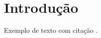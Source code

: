 \section{Introdução}
\label{sec:introducao}


Exemplo de texto com citação \cite{stallings2008criptografia}.